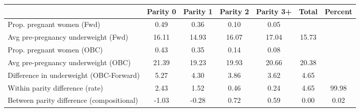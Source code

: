 \begin{tabular}{l*{6}{c}}
\toprule
            &\multicolumn{1}{c}{Parity 0}&\multicolumn{1}{c}{Parity 1}&\multicolumn{1}{c}{Parity 2}&\multicolumn{1}{c}{Parity 3+}&\multicolumn{1}{c}{Total}&\multicolumn{1}{c}{Percent}\\
\midrule
\midrule
Prop. pregnant women (Fwd)&        0.49&        0.36&        0.10&        0.05&            &            \\
Avg pre-pregnancy underweight (Fwd)&       16.11&       14.93&       16.07&       17.04&       15.73&            \\
Prop. pregnant women (OBC)&        0.43&        0.35&        0.14&        0.08&            &            \\
Avg pre-pregnancy underweight (OBC)&       21.39&       19.23&       19.93&       20.66&       20.38&            \\
Difference in underweight (OBC-Forward)&        5.27&        4.30&        3.86&        3.62&        4.65&            \\
Within parity difference (rate)&        2.43&        1.52&        0.46&        0.24&        4.65&       99.98\\
Between parity difference (compositional)&       -1.03&       -0.28&        0.72&        0.59&        0.00&        0.02\\
\bottomrule
\end{tabular}
